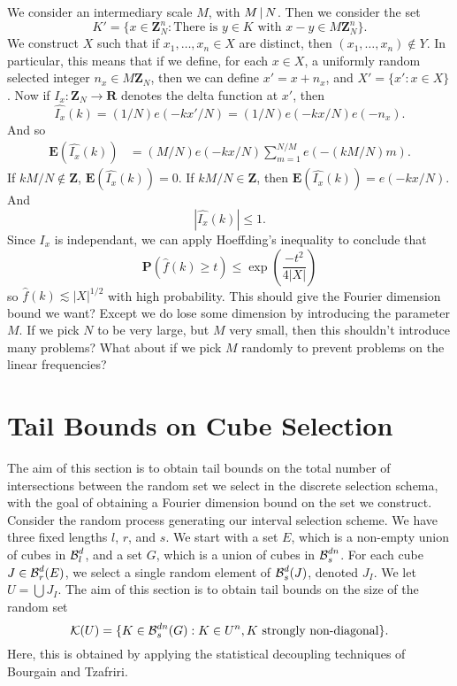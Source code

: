 We consider an intermediary scale $M$, with $M \operatorname{\mid} N$. Then we consider the set
%
\[ K' = \{ x \in \mathbf{Z}_N^n : \text{There is $y \in K$ with $x - y \in M \mathbf{Z}_N^n$} \}. \]
%
We construct $X$ such that if $x_1, \dots, x_n \in X$ are distinct, then $(x_1, \dots, x_n) \not \in Y$. In particular, this means that if we define, for each $x \in X$, a uniformly random selected integer $n_x \in M \mathbf{Z}_N$, then we can define $x' = x + n_x$, and $X' = \{ x' : x \in X \}$. Now if $I_x: \mathbf{Z}_N \to \mathbf{R}$ denotes the delta function at $x'$, then
%
\[ \widehat{I_x}(k) = (1/N) e(-kx'/N) = (1/N) e(-kx/N) e(-n_x). \]
%
And so
%
\begin{align*}
	\mathbf{E}(\widehat{I_x}(k)) &= (M/N) e(-kx/N) \sum_{m = 1}^{N/M} e(-(kM/N)m).
\end{align*}
%
If $kM/N \not \in \mathbf{Z}$, $\mathbf{E}(\widehat{I_x}(k)) = 0$. If $kM/N \in \mathbf{Z}$, then $\mathbf{E}(\widehat{I_x}(k)) = e(-kx/N)$. And
%
\[ |\widehat{I_x}(k)| \leq 1. \]
%
Since $I_x$ is independant, we can apply Hoeffding's inequality to conclude that
%
\[ \mathbf{P} \left( \widehat{f}(k) \geq t \right) \leq \exp \left( \frac{-t^2}{4|X|} \right) \]
%
so $\widehat{f}(k) \lesssim |X|^{1/2}$ with high probability. This should give the Fourier dimension bound we want? Except we do lose some dimension by introducing the parameter $M$. If we pick $N$ to be very large, but $M$ very small, then this shouldn't introduce many problems? What about if we pick $M$ randomly to prevent problems on the linear frequencies?






\section{Tail Bounds on Cube Selection}

The aim of this section is to obtain tail bounds on the total number of intersections between the random set we select in the discrete selection schema, with the goal of obtaining a Fourier dimension bound on the set we construct. Consider the random process generating our interval selection scheme. We have three fixed lengths $l$, $r$, and $s$. We start with a set $E$, which is a non-empty union of cubes in $\operatorname{\mathcal{B}}^d_l$, and a set $G$, which is a union of cubes in $\operatorname{\mathcal{B}}^{dn}_s$. For each cube $J \in \operatorname{\mathcal{B}}^d_r(E)$, we select a single random element of $\operatorname{\mathcal{B}}^d_s(J)$, denoted $J_I$. We let $U = \bigcup J_I$. The aim of this section is to obtain tail bounds on the size of the random set
%
\[ \mathcal{K}(U) = \{ K \in \operatorname{\mathcal{B}}^{dn}_s(G): K \in U^n, K\ \text{strongly non-diagonal} \}. \]
%
Here, this is obtained by applying the statistical decoupling techniques of Bourgain and Tzafriri.

